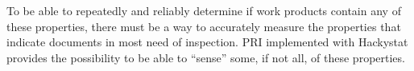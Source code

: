 To be able to repeatedly and reliably determine if work products contain
any of these properties, there must be a way to accurately measure the
properties that indicate documents in most need of inspection. PRI
implemented with Hackystat provides the possibility to be able to ``sense''
some, if not all, of these properties.

















